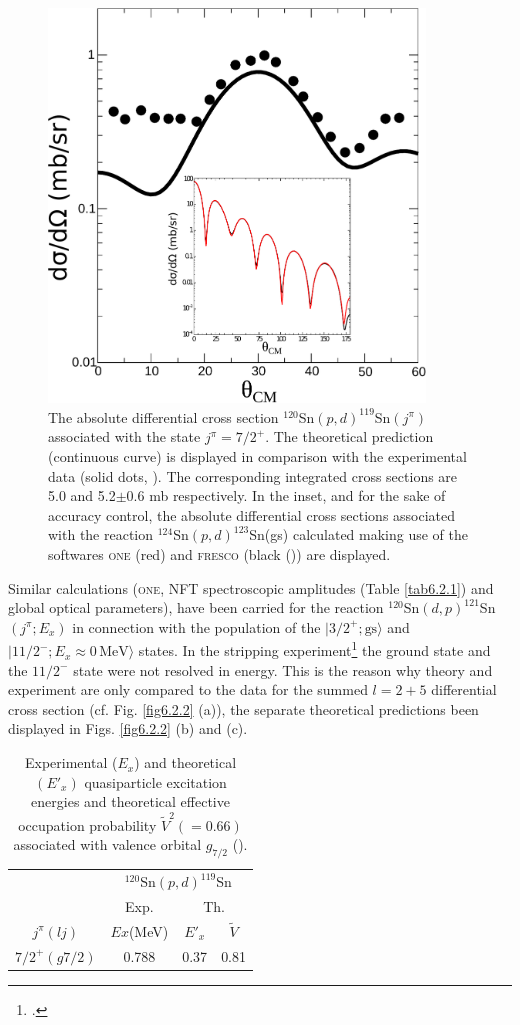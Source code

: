     \begin{figure}
    \centerline{\includegraphics*[width=10cm,angle=0]{C6/figs_C6/fig6_2_1x.pdf}}
    \caption{The absolute differential cross section $^{120}$Sn$(p,d)^{119}$Sn$(j^\pi)$ associated with the state $j^\pi=7/2^+$. The theoretical prediction (continuous curve) is displayed in comparison with the experimental data (solid dots,  \cite{Dickey:82}). The corresponding integrated cross sections are 5.0 and 5.2$\pm0.6$ mb respectively. In the inset, and for the sake of accuracy control, the absolute differential cross sections associated with the reaction $^{124}$Sn$(p,d)^{123}$Sn(gs) calculated making use of the softwares \textsc{one} (red) and \textsc{fresco} (black (\cite{Thompson:88})) are displayed. }\label{fig6.2.1}
    \end{figure}
  Similar calculations (\textsc{one}, NFT spectroscopic amplitudes (Table \ref{tab6.2.1}) and global optical parameters), have been carried for the reaction $^{120}$Sn$(d,p)^{121}$Sn $(j^{\pi};E_x)$ in connection with the population 	of the $|3/2^+; \text{gs}\rangle$ and $|11/2^-;E_x\approx 0\, \text{MeV}\rangle$ states.
  In the stripping  experiment\footnote{\cite{Bechara:75}.} the 	ground state and the $11/2^-$ state were not resolved in energy. This is the reason why theory and experiment are only compared to the data for the summed $l=2+5$ differential cross section (cf. Fig. \ref{fig6.2.2} (a)), the separate theoretical predictions been displayed in Figs. \ref{fig6.2.2} (b) and (c).
    \begin{table}
    \centering
    \begin{tabular}{|c|c|c|c|}
\hline
&\multicolumn{3}{c|}{$^{120}$Sn$(p,d)^{119}$Sn}\\
\cline{2-4}
&Exp.&\multicolumn{2}{|c|}{Th.}\\
\hline
$j^{\pi}(lj)$& $Ex$(MeV)& $E'_x$&$\tilde V$\\
\hline
$7/2^+(g7/2)$&0.788&0.37&0.81\\
\hline
    \end{tabular}\caption{Experimental ($E_x$) and theoretical $(E'_x)$ quasiparticle excitation energies and theoretical effective occupation probability $\tilde V^2(=0.66)$ associated with valence orbital $g_{7/2}$ (\cite{Idini:15}).}\label{tab4.2.1}
    \end{table}
